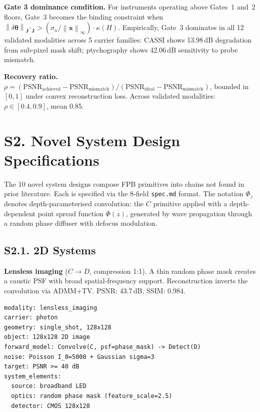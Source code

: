 \documentclass[11pt,a4paper]{article}
\newcommand{\norm}[1]{\left\|#1\right\|}
\begin{document}
\textbf{Gate 3 dominance condition.}
For instruments operating above Gates~1 and~2 floors, Gate~3 becomes the binding constraint when $\norm{\delta\boldsymbol{\theta}}_{\mathbf{J}^\top\mathbf{J}} > (\sigma_n / \norm{\mathbf{x}}_\infty) \cdot \kappa(H)$.  Empirically, Gate~3 dominates in all 12 validated modalities across 5 carrier families: CASSI shows 13.98\,dB degradation from sub-pixel mask shift; ptychography shows 42.06\,dB sensitivity to probe mismatch.

\textbf{Recovery ratio.}
$\rho = (\mathrm{PSNR}_{\mathrm{achieved}} - \mathrm{PSNR}_{\mathrm{mismatch}}) / (\mathrm{PSNR}_{\mathrm{ideal}} - \mathrm{PSNR}_{\mathrm{mismatch}})$, bounded in $[0, 1]$ under convex reconstruction loss.  Across validated modalities: $\rho \in [0.4, 0.9]$, mean 0.85.

\section{S2. Novel System Design Specifications}

The 10 novel system designs compose FPB primitives into chains not found in prior literature.  Each is specified via the 8-field \texttt{spec.md} format.  The notation $\Phi_z$ denotes depth-parameterised convolution: the $C$ primitive applied with a depth-dependent point spread function $\Phi(z)$, generated by wave propagation through a random phase diffuser with defocus modulation.

\subsection{S2.1. 2D Systems}

\textbf{Lensless imaging} ($C \to D$, compression 1:1).
A thin random phase mask creates a caustic PSF with broad spatial-frequency support.  Reconstruction inverts the convolution via ADMM+TV.  PSNR: 43.7\,dB, SSIM: 0.984.

\begin{verbatim}
modality: lensless_imaging
carrier: photon
geometry: single_shot, 128x128
object: 128x128 2D image
forward_model: Convolve(C, psf=phase_mask) -> Detect(D)
noise: Poisson I_0=5000 + Gaussian sigma=3
target: PSNR >= 40 dB
system_elements:
  source: broadband LED
  optics: random phase mask (feature_scale=2.5)
  detector: CMOS 128x128
\end{verbatim}
\end{document}
